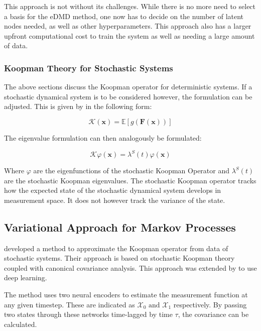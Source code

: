 This approach is not without its challenges. While there is no more need to select a basis for the eDMD method, one now
has to decide on the number of latent nodes needed, as well as other hyperparameters. This approach also has a larger
upfront computational cost to train the system as well as needing a large amount of data.

\subsubsection{Koopman Theory for Stochastic Systems}
\label{subsubsec:koopman_stochastic}
The above sections discuss the Koopman operator for deterministic systems. If a stochastic dynamical system is to be considered however, the formulation can be adjusted. This is given by \textcite{crnjaric-zicKoopmanOperatorSpectrum2020}
in the following form: 

\begin{equation}
    \mathcal{K}(\mathbf{x}) = \mathbb{E}[g(\mathbf{F}(\mathbf{x}))]
\end{equation}

The eigenvalue formulation can then analogously be formulated:

\begin{equation}
    \mathcal{K}\varphi(\mathbf{x}) = \lambda^S(t)\varphi(\mathbf{x})
\end{equation}

Where $\varphi$ are the eigenfunctions of the stochastic Koopman Operator and $\lambda^S(t)$ are the stochastic Koopman
eigenvalues. The stochastic Koopman operator tracks how the expected state of the stochastic dynamical system develops
in measurement space. It does not however track the variance of the state. 

\subsection{Variational Approach for Markov Processes}
\label{subsec:vamp}
\textcite{wuVariationalApproachLearning2019} developed a method to approximate the Koopman operator from data of
stochastic systems. Their approach is based on stochastic Koopman theory coupled with canonical covariance analysis. This
approach was extended by \textcite{mardtVAMPnetsDeepLearning2018} to use deep learning. 

The method uses two neural encoders to estimate the measurement function at any given timestep. These are indicated as
\(\mathcal{X}_0 \text{ and } \mathcal{X}_1\) respectively. By passing two states through these networks time-lagged by
time \(\tau\), the covariance can be calculated.

